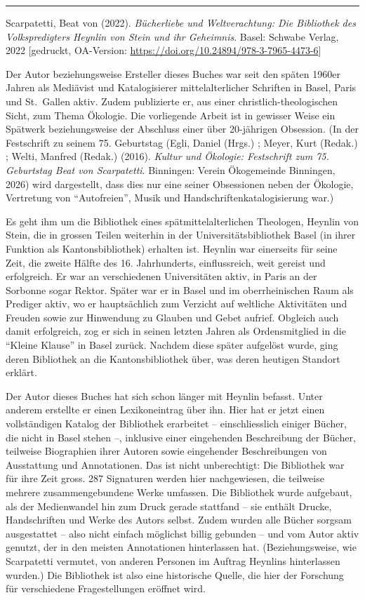 \documentclass[a4paper,
fontsize=11pt,
oneside,
numbers=noperiodatend,
parskip=half-,
bibliography=totoc,
final
]{scrartcl}
\begin{document}
\begin{center}\rule{0.5\linewidth}{0.5pt}\end{center}

Scarpatetti, Beat von (2022). \emph{Bücherliebe und Weltverachtung: Die
Bibliothek des Volkspredigters Heynlin von Stein und ihr Geheimnis}.
Basel: Schwabe Verlag, 2022 {[}gedruckt, OA-Version:
\url{https://doi.org/10.24894/978-3-7965-4473-6}{]}

Der Autor beziehungsweise Ersteller dieses Buches war seit den späten
1960er Jahren als Mediävist und Katalogisierer mittelalterlicher
Schriften in Basel, Paris und St.~Gallen aktiv. Zudem publizierte er,
aus einer christlich-theologischen Sicht, zum Thema Ökologie. Die
vorliegende Arbeit ist in gewisser Weise ein Spätwerk beziehungsweise
der Abschluss einer über 20-jährigen Obsession. (In der Festschrift zu
seinem 75. Geburtstag (Egli, Daniel (Hrgs.) ; Meyer, Kurt (Redak.) ;
Welti, Manfred (Redak.) (2016). \emph{Kultur und Ökologie: Festschrift
zum 75. Geburtstag Beat von Scarpatetti}. Binningen: Verein Ökogemeinde
Binningen, 2026) wird dargestellt, dass dies nur eine seiner Obsessionen
neben der Ökologie, Vertretung von ``Autofreien'', Musik und
Handschriftenkatalogisierung war.)

Es geht ihm um die Bibliothek eines spätmittelalterlichen Theologen,
Heynlin von Stein, die in grossen Teilen weiterhin in der
Universitätsbibliothek Basel (in ihrer Funktion als Kantonsbibliothek)
erhalten ist. Heynlin war einerseits für seine Zeit, die zweite Hälfte
des 16. Jahrhunderts, einflussreich, weit gereist und erfolgreich. Er
war an verschiedenen Universitäten aktiv, in Paris an der Sorbonne sogar
Rektor. Später war er in Basel und im oberrheinischen Raum als Prediger
aktiv, wo er hauptsächlich zum Verzicht auf weltliche Aktivitäten und
Freuden sowie zur Hinwendung zu Glauben und Gebet aufrief. Obgleich auch
damit erfolgreich, zog er sich in seinen letzten Jahren als
Ordensmitglied in die ``Kleine Klause'' in Basel zurück. Nachdem diese
später aufgelöst wurde, ging deren Bibliothek an die Kantonsbibliothek
über, was deren heutigen Standort erklärt.

Der Autor dieses Buches hat sich schon länger mit Heynlin befasst. Unter
anderem erstellte er einen Lexikoneintrag über ihn. Hier hat er jetzt
einen vollständigen Katalog der Bibliothek erarbeitet -- einschliesslich
einiger Bücher, die nicht in Basel stehen --, inklusive einer
eingehenden Beschreibung der Bücher, teilweise Biographien ihrer Autoren
sowie eingehender Beschreibungen von Ausstattung und Annotationen. Das
ist nicht unberechtigt: Die Bibliothek war für ihre Zeit gross. 287
Signaturen werden hier nachgewiesen, die teilweise mehrere
zusammengebundene Werke umfassen. Die Bibliothek wurde aufgebaut, als
der Medienwandel hin zum Druck gerade stattfand -- sie enthält Drucke,
Handschriften und Werke des Autors selbst. Zudem wurden alle Bücher
sorgsam ausgestattet -- also nicht einfach möglichst billig gebunden --
und vom Autor aktiv genutzt, der in den meisten Annotationen
hinterlassen hat. (Beziehungsweise, wie Scarpatetti vermutet, von
anderen Personen im Auftrag Heynlins hinterlassen wurden.) Die
Bibliothek ist also eine historische Quelle, die hier der Forschung für
verschiedene Fragestellungen eröffnet wird.
\end{document}
